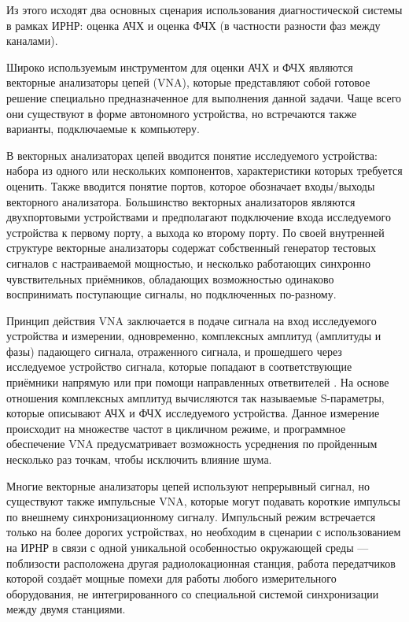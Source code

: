 \documentclass{report}
\begin{document}
Из этого исходят два основных сценария использования диагностической системы в рамках ИРНР: оценка АЧХ и оценка ФЧХ (в частности разности фаз между каналами).

Широко используемым инструментом для оценки АЧХ и ФЧХ являются векторные анализаторы цепей (VNA), которые представляют собой готовое решение специально предназначенное для выполнения данной задачи. Чаще всего они существуют в форме автономного устройства, но встречаются также варианты, подключаемые к компьютеру.

В векторных анализаторах цепей вводится понятие исследуемого устройства: набора из одного или нескольких компонентов, характеристики которых требуется оценить. Также вводится понятие портов, которое обозначает входы/выходы векторного анализатора. Большинство векторных анализаторов являются двухпортовыми устройствами и предполагают подключение входа исследуемого устройства к первому порту, а выхода ко второму порту. По своей внутренней структуре векторные анализаторы содержат собственный генератор тестовых сигналов с настраиваемой мощностью, и несколько работающих синхронно чувствительных приёмников, обладающих возможностью одинаково воспринимать поступающие сигналы, но подключенных по-разному.

Принцип действия VNA заключается в подаче сигнала на вход исследуемого устройства и измерении, одновременно, комплексных амплитуд (амплитуды и фазы) падающего сигнала, отраженного сигнала, и прошедшего через исследуемое устройство сигнала, которые попадают в соответствующие приёмники напрямую или при помощи направленных ответвителей \cite{vna1}. На основе отношения комплексных амплитуд вычисляются так называемые S-параметры, которые описывают АЧХ и ФЧХ исследуемого устройства. Данное измерение происходит на множестве частот в цикличном режиме, и программное обеспечение VNA предусматривает возможность усреднения по пройденным несколько раз точкам, чтобы исключить влияние шума.

Многие векторные анализаторы цепей используют непрерывный сигнал, но существуют также импульсные VNA, которые могут подавать короткие импульсы по внешнему синхронизационному сигналу. Импульсный режим встречается только на более дорогих устройствах, но необходим в сценарии с использованием на ИРНР в связи с одной уникальной особенностью окружающей среды --- поблизости расположена другая радиолокационная станция, работа передатчиков которой создаёт мощные помехи для работы любого измерительного оборудования, не интегрированного со специальной системой синхронизации между двумя станциями.
\end{document}

